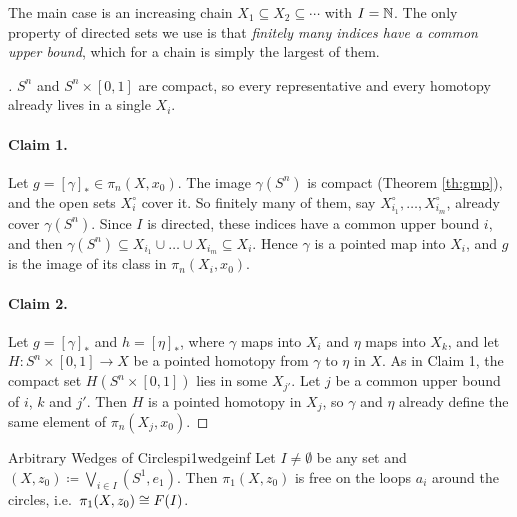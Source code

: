The main case is an increasing chain $X_1\subseteq X_2\subseteq\cdots$ with $I=\mathbb{N}$. The only property of directed sets we use is that \emph{finitely many indices have a common upper bound}, which for a chain is simply the largest of them.

\newpage

\begin{proof}[]
  $S^n$ and $S^n\times[0,1]$ are compact, so every representative and every homotopy already lives in a single $X_i$.

  \paragraph{Claim 1.} Let $g=[\gamma]_*\in\pi_n(X,x_0)$. The image $\gamma(S^n)$ is compact (Theorem \ref{th:gmp}), and the open sets $X_i^\circ$ cover it. So finitely many of them, say $X_{i_1}^\circ,\dots,X_{i_m}^\circ$, already cover $\gamma(S^n)$. Since $I$ is directed, these indices have a common upper bound $i$, and then $\gamma(S^n)\subseteq X_{i_1}\cup\dots\cup X_{i_m}\subseteq X_i$. Hence $\gamma$ is a pointed map into $X_i$, and $g$ is the image of its class in $\pi_n(X_i,x_0)$.

  \paragraph{Claim 2.} Let $g=[\gamma]_*$ and $h=[\eta]_*$, where $\gamma$ maps into $X_i$ and $\eta$ maps into $X_k$, and let $H:S^n\times[0,1]\to X$ be a pointed homotopy from $\gamma$ to $\eta$ in $X$. As in Claim 1, the compact set $H(S^n\times[0,1])$ lies in some $X_{j'}$. Let $j$ be a common upper bound of $i$, $k$ and $j'$. Then $H$ is a pointed homotopy in $X_j$, so $\gamma$ and $\eta$ already define the same element of $\pi_n(X_j,x_0)$.
\end{proof}

\begin{example}{Arbitrary Wedges of Circles}{pi1wedgeinf}
  Let $I\neq\emptyset$ be any set and $(X,z_0)\coloneq\bigvee_{i\in I}(S^1,e_1)$. Then $\pi_1(X,z_0)$ is free on the loops $a_i$ around the circles, i.e.\ $\pi_1(X,z_0)\cong F(I)$.
\end{example}

